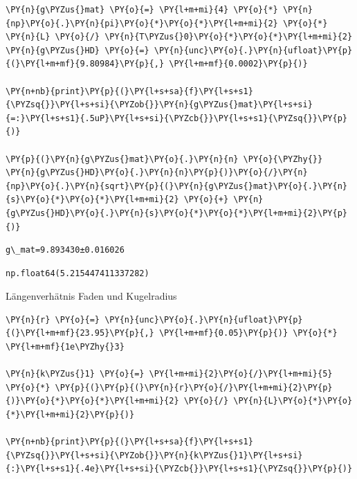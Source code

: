     \begin{tcolorbox}[breakable, size=fbox, boxrule=1pt, pad at break*=1mm,colback=cellbackground, colframe=cellborder]
\begin{Verbatim}[commandchars=\\\{\}]
\PY{n}{g\PYZus{}mat} \PY{o}{=} \PY{l+m+mi}{4} \PY{o}{*} \PY{n}{np}\PY{o}{.}\PY{n}{pi}\PY{o}{*}\PY{o}{*}\PY{l+m+mi}{2} \PY{o}{*} \PY{n}{L} \PY{o}{/} \PY{n}{T\PYZus{}0}\PY{o}{*}\PY{o}{*}\PY{l+m+mi}{2}
\PY{n}{g\PYZus{}HD} \PY{o}{=} \PY{n}{unc}\PY{o}{.}\PY{n}{ufloat}\PY{p}{(}\PY{l+m+mf}{9.80984}\PY{p}{,} \PY{l+m+mf}{0.0002}\PY{p}{)}

\PY{n+nb}{print}\PY{p}{(}\PY{l+s+sa}{f}\PY{l+s+s1}{\PYZsq{}}\PY{l+s+si}{\PYZob{}}\PY{n}{g\PYZus{}mat}\PY{l+s+si}{=:}\PY{l+s+s1}{.5uP}\PY{l+s+si}{\PYZcb{}}\PY{l+s+s1}{\PYZsq{}}\PY{p}{)}

\PY{p}{(}\PY{n}{g\PYZus{}mat}\PY{o}{.}\PY{n}{n} \PY{o}{\PYZhy{}} \PY{n}{g\PYZus{}HD}\PY{o}{.}\PY{n}{n}\PY{p}{)}\PY{o}{/}\PY{n}{np}\PY{o}{.}\PY{n}{sqrt}\PY{p}{(}\PY{n}{g\PYZus{}mat}\PY{o}{.}\PY{n}{s}\PY{o}{*}\PY{o}{*}\PY{l+m+mi}{2} \PY{o}{+} \PY{n}{g\PYZus{}HD}\PY{o}{.}\PY{n}{s}\PY{o}{*}\PY{o}{*}\PY{l+m+mi}{2}\PY{p}{)}
\end{Verbatim}
\end{tcolorbox}

    \begin{Verbatim}[commandchars=\\\{\}]
g\_mat=9.893430±0.016026
    \end{Verbatim}

            \begin{tcolorbox}[breakable, size=fbox, boxrule=.5pt, pad at break*=1mm, opacityfill=0]
\begin{Verbatim}[commandchars=\\\{\}]
np.float64(5.215447411337282)
\end{Verbatim}
\end{tcolorbox}
        
    Längenverhätnis Faden und Kugelradius

    \begin{tcolorbox}[breakable, size=fbox, boxrule=1pt, pad at break*=1mm,colback=cellbackground, colframe=cellborder]
\begin{Verbatim}[commandchars=\\\{\}]
\PY{n}{r} \PY{o}{=} \PY{n}{unc}\PY{o}{.}\PY{n}{ufloat}\PY{p}{(}\PY{l+m+mf}{23.95}\PY{p}{,} \PY{l+m+mf}{0.05}\PY{p}{)} \PY{o}{*} \PY{l+m+mf}{1e\PYZhy{}3} 

\PY{n}{k\PYZus{}1} \PY{o}{=} \PY{l+m+mi}{2}\PY{o}{/}\PY{l+m+mi}{5} \PY{o}{*} \PY{p}{(}\PY{p}{(}\PY{n}{r}\PY{o}{/}\PY{l+m+mi}{2}\PY{p}{)}\PY{o}{*}\PY{o}{*}\PY{l+m+mi}{2} \PY{o}{/} \PY{n}{L}\PY{o}{*}\PY{o}{*}\PY{l+m+mi}{2}\PY{p}{)} 

\PY{n+nb}{print}\PY{p}{(}\PY{l+s+sa}{f}\PY{l+s+s1}{\PYZsq{}}\PY{l+s+si}{\PYZob{}}\PY{n}{k\PYZus{}1}\PY{l+s+si}{:}\PY{l+s+s1}{.4e}\PY{l+s+si}{\PYZcb{}}\PY{l+s+s1}{\PYZsq{}}\PY{p}{)}
\end{Verbatim}
\end{tcolorbox}

